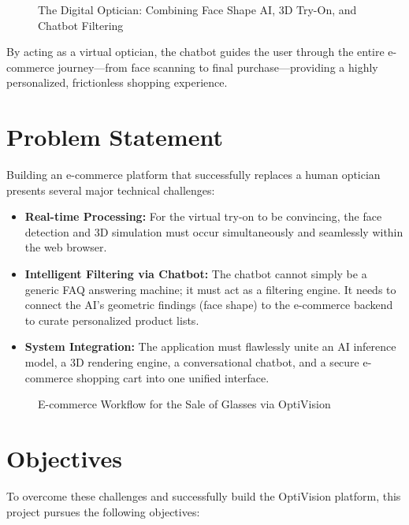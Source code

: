\begin{figure}[H]
    \centering
    \vspace{8cm}
    \caption{The Digital Optician: Combining Face Shape AI, 3D Try-On, and Chatbot Filtering}
    \label{fig:optivision_concept}
\end{figure}

By acting as a virtual optician, the chatbot guides the user through the entire e-commerce journey—from face scanning to final purchase—providing a highly personalized, frictionless shopping experience.

\section{Problem Statement}
\label{sec:intro_problem}

Building an e-commerce platform that successfully replaces a human optician presents several major technical challenges:

\begin{itemize}
    \item \textbf{Real-time Processing:} For the virtual try-on to be convincing, the face detection and 3D simulation must occur simultaneously and seamlessly within the web browser.
    \item \textbf{Intelligent Filtering via Chatbot:} The chatbot cannot simply be a generic FAQ answering machine; it must act as a filtering engine. It needs to connect the AI's geometric findings (face shape) to the e-commerce backend to curate personalized product lists.
    \item \textbf{System Integration:} The application must flawlessly unite an AI inference model, a 3D rendering engine, a conversational chatbot, and a secure e-commerce shopping cart into one unified interface.
\end{itemize}

\begin{figure}[H]
    \centering
    \vspace{8cm}
    \caption{E-commerce Workflow for the Sale of Glasses via OptiVision}
    \label{fig:ecommerce_workflow}
\end{figure}

\section{Objectives}
\label{sec:intro_objectives}

To overcome these challenges and successfully build the OptiVision platform, this project pursues the following objectives:

